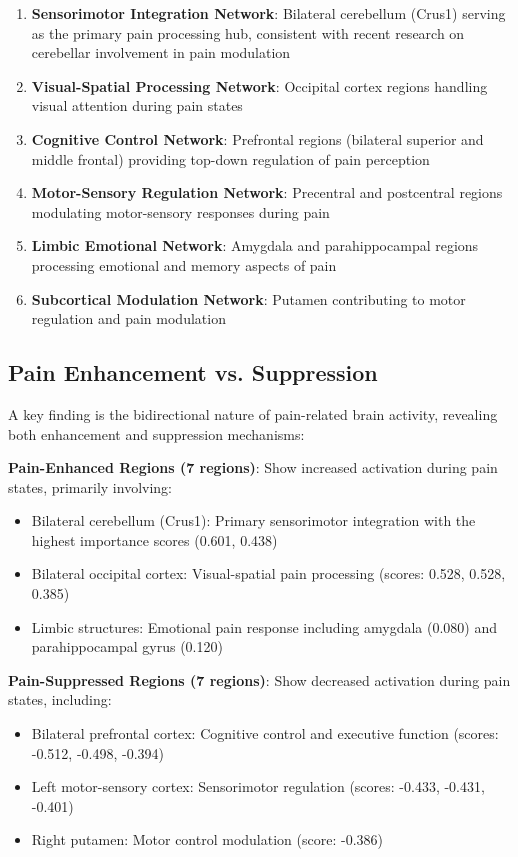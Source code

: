 \documentclass[10pt,journal,compsoc]{IEEEtran}
\begin{document}
\begin{enumerate}
\item \textbf{Sensorimotor Integration Network}: Bilateral cerebellum (Crus1) serving as the primary pain processing hub, consistent with recent research on cerebellar involvement in pain modulation \cite{moulton2010cerebellum,diedrichsen2019cerebellum}
\item \textbf{Visual-Spatial Processing Network}: Occipital cortex regions handling visual attention during pain states
\item \textbf{Cognitive Control Network}: Prefrontal regions (bilateral superior and middle frontal) providing top-down regulation of pain perception
\item \textbf{Motor-Sensory Regulation Network}: Precentral and postcentral regions modulating motor-sensory responses during pain
\item \textbf{Limbic Emotional Network}: Amygdala and parahippocampal regions processing emotional and memory aspects of pain
\item \textbf{Subcortical Modulation Network}: Putamen contributing to motor regulation and pain modulation
\end{enumerate}

\subsection{Pain Enhancement vs. Suppression}

A key finding is the bidirectional nature of pain-related brain activity, revealing both enhancement and suppression mechanisms:

\textbf{Pain-Enhanced Regions (7 regions)}: Show increased activation during pain states, primarily involving:
\begin{itemize}
\item Bilateral cerebellum (Crus1): Primary sensorimotor integration with the highest importance scores (0.601, 0.438)
\item Bilateral occipital cortex: Visual-spatial pain processing (scores: 0.528, 0.528, 0.385)  
\item Limbic structures: Emotional pain response including amygdala (0.080) and parahippocampal gyrus (0.120)
\end{itemize}

\textbf{Pain-Suppressed Regions (7 regions)}: Show decreased activation during pain states, including:
\begin{itemize}
\item Bilateral prefrontal cortex: Cognitive control and executive function (scores: -0.512, -0.498, -0.394)
\item Left motor-sensory cortex: Sensorimotor regulation (scores: -0.433, -0.431, -0.401)
\item Right putamen: Motor control modulation (score: -0.386)
\end{itemize}
\end{document}
